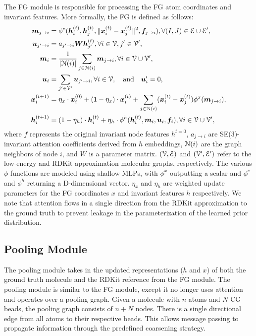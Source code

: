 The FG module is responsible for processing the FG atom coordinates and invariant features. More formally, the FG is defined as follows:
\begin{equation}
\begin{aligned}
\bm{m}_{j\to i} &= \phi^e(\bm{h}_i^{(t)},\bm{h}_j^{(t)},\lVert\bm{x}_i^{(t)}-\bm{x}_j^{(t)}\rVert^2,\bm{f}_{j\to i}),\forall (I,J)\in {\mathcal{E}}\cup{\mathcal{E}}', \\
\bm{u}_{j'\to i} &= a_{j'\to i} \bm{W} \bm{h}_{j'}^{(t)},\forall i\in{\mathcal{V}},j'\in{\mathcal{V}}', \\
\bm{m}_i &= \frac{1}{|{\mathcal{N}}(i)|} \sum_{j\in{\mathcal{N}}(i)}\bm{m}_{j\to i},\forall i\in{\mathcal{V}}\cup{\mathcal{V}}', \\
\bm{u}_{i} &=  \sum_{j'\in{\mathcal{V}}'}\bm{u}_{j'\to i},\forall i \in{\mathcal{V}}, \quad \text{and} \quad \bm{u}'_{i} =  0, \\
\bm{x}_i^{(t+1)} &= \eta_x \cdot \bm{x}_i^{(0)} + (1 - \eta_x) \cdot \bm{x}_i^{(t)} + \sum_{j\in{\mathcal{N}}(i)} (\bm{x}_i^{(t)}-\bm{x}_j^{(t)})\phi^x(\bm{m}_{j\to i}), \\
\bm{h}_i^{(t+1)} &= (1 - \eta_h) \cdot \bm{h}_i^{(t)} + \eta_h \cdot \phi^h(\bm{h}_i^{(t)},\bm{m}_i,\bm{u}_{i}, \bm{f}_i),\forall i\in{\mathcal{V}}\cup{\mathcal{V}}',
\end{aligned}
\label{fine-grain-eqn}
\end{equation}
where $f$ represents the original invariant node features $h^{t=0}$, $a_{j\to i}$ are SE(3)-invariant attention coefficients derived from $h$ embeddings, ${\mathcal{N}}(i)$ are the graph neighbors of node $i$, and $W$ is a parameter matrix. $({\mathcal{V}}, {\mathcal{E}})$ and $({\mathcal{V}}', {\mathcal{E}}')$ refer to the low-energy and RDKit approximation molecular graphs, respectively. The various $\phi$ functions are modeled using shallow MLPs, with  $\phi^x$ outputting a scalar and $\phi^e$ and $\phi^h$ returning a D-dimensional vector. $\eta_x$ and $\eta_h$ are weighted update parameters for the FG coordinates $x$ and invariant features $h$ respectively. We note that attention flows in a single direction from the RDKit approximation to the ground truth to prevent leakage in the parameterization of the learned prior distribution.  

\subsection{Pooling Module}
\label{section:eqn-pool}
The pooling module takes in the updated representations ($h$ and $x$) of both the ground truth molecule and the RDKit reference from the FG module.
The pooling module is similar to the FG module, except it no longer uses attention and operates over a pooling graph.
Given a molecule with $n$ atoms and $N$ CG beads, the pooling graph consists of $n + N$ nodes. There is a single directional edge from all atoms to their respective beads. %
This allows message passing to propagate information through the predefined coarsening strategy.

